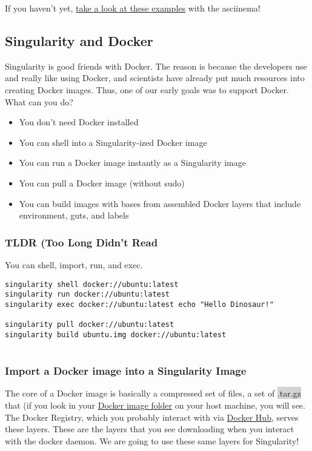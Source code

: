 \documentclass[a4paper]{article}
\begin{document}
If you haven’t yet, \href{https://asciinema.org/a/139153?speed=3}{take a look at these examples} with the asciinema!


\subsection{Singularity and Docker}

Singularity is good friends with Docker. The reason is because the developers use and really like using Docker, and scientists have already put much resources into creating Docker images. Thus, one of our early goals was to support Docker. What can you do?

\begin{itemize}
\item You don’t need Docker installed
\item You can shell into a Singularity-ized Docker image
\item You can run a Docker image instantly as a Singularity image
\item You can pull a Docker image (without sudo)
\item You can build images with bases from assembled Docker layers that include environment, guts, and labels
\end{itemize}

\subsubsection{TLDR (Too Long Didn't Read}
You can shell, import, run, and exec.

\begin{lstlisting}[frame=single]
singularity shell docker://ubuntu:latest
singularity run docker://ubuntu:latest
singularity exec docker://ubuntu:latest echo "Hello Dinosaur!"

singularity pull docker://ubuntu:latest
singularity build ubuntu.img docker://ubuntu:latest
  
\end{lstlisting}
   

\subsubsection{Import a Docker image into a Singularity Image}

The core of a Docker image is basically a compressed set of files, a set of  \colorbox{lightgray}{.tar.gz} that (if you look in your \href{http://stackoverflow.com/questions/19234831/where-are-docker-images-stored-on-the-host-machine}{Docker image folder} on your host machine, you will see. The Docker Registry, which you probably interact with via \href{https://hub.docker.com/}{Docker Hub}, serves these layers. These are the layers that you see downloading when you interact with the docker daemon. We are going to use these same layers for Singularity!
\end{document}
